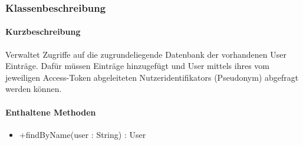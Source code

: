 \subsubsection*{Klassenbeschreibung}%
\paragraph*{Kurzbeschreibung}
Verwaltet Zugriffe auf die zugrundeliegende Datenbank der vorhandenen User Einträge.
Dafür müssen Einträge hinzugefügt und User mittels ihres vom jeweiligen Access-Token abgeleiteten Nutzeridentifikators (Pseudonym) abgefragt werden können.
\paragraph*{Enthaltene Methoden}
\begin{itemize}
    \item +findByName(user : String) : User
\end{itemize}
